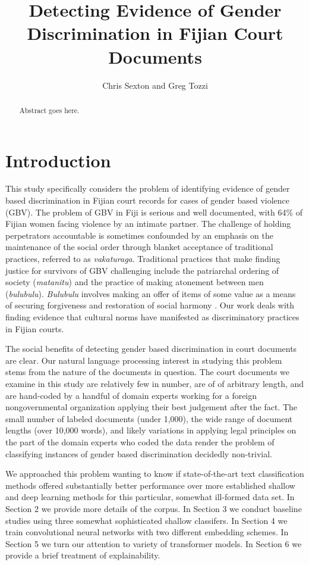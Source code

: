 \documentclass[twocolumn,10pt]{wmrDoc}
\title{Detecting Evidence of Gender Discrimination in Fijian Court Documents}
\author{Chris Sexton and Greg Tozzi
    \affiliation{
    School of Information\\
	University of California, Berkeley\\
    email: cjsexton, greg.tozzi@ischool.berkeley.edu
    }	
}
\begin{document}
\maketitle    
\begin{abstract}
{\it 

Abstract goes here. 

}
\end{abstract}

\section{Introduction}
This study specifically considers the problem of identifying evidence of gender based discrimination in Fijian court records for cases of gender based violence (GBV).  The problem of GBV in Fiji is serious and well documented, with 64\% of Fijian women facing violence by an intimate partner.  The challenge of holding perpetrators accountable is sometimes confounded by an emphasis on the maintenance of the social order through blanket acceptance of traditional practices, referred to as \emph{vakaturaga}.  Traditional practices that make finding justice for survivors of GBV challenging include the patriarchal ordering of society (\emph{matanitu}) and the practice of making atonement between men (\emph{bulubulu}).  \emph{Bulubulu} involves making an offer of items of some value as a means of securing forgiveness and restoration of social harmony \cite{newland}.  Our work deals with finding evidence that cultural norms have manifested as discriminatory practices in Fijian courts.

The social benefits of detecting gender based discrimination in court documents are clear.  Our natural language processing interest in studying this problem stems from the nature of the documents in question.  The court documents we examine in this study are relatively few in number, are of of arbitrary length, and are hand-coded by a handful of domain experts working for a foreign nongovernmental organization applying their best judgement after the fact.  The small number of labeled documents (under 1,000), the wide range of document lengths (over 10,000 words), and likely variations in applying legal principles on the part of the domain experts who coded the data render the problem of classifying instances of gender based discrimination decidedly non-trivial.

We approached this problem wanting to know if state-of-the-art text classification methods offered substantially better performance over more established shallow and deep learning methods for this particular, somewhat ill-formed data set.  In Section 2 we provide more details of the corpus.  In Section 3 we conduct baseline studies using three somewhat sophisticated shallow classifers.  In Section 4 we train convolutional neural networks with two different embedding schemes.  In Section 5 we turn our attention to variety of transformer models.  In Section 6 we provide a brief treatment of explainability.
\end{document}
